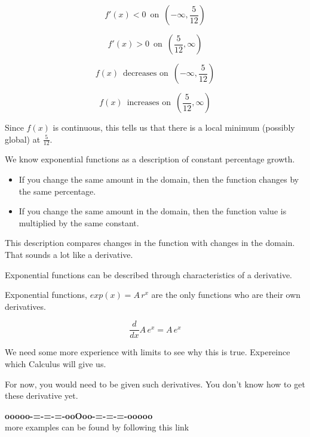 \documentclass{ximera}
\begin{document}
\begin{example}
\[
f'(x) < 0 \, \text{ on } \, \left( -\infty, \frac{5}{12} \right)
\]


\[
f'(x) > 0 \, \text{ on } \, \left( \frac{5}{12}, \infty \right)
\]





\[
f(x)  \, \text{ decreases on } \, \left( -\infty, \frac{5}{12} \right)
\]


\[
f(x)  \, \text{ increases on } \, \left( \frac{5}{12}, \infty \right)
\]



Since $f(x)$ is continuous, this tells us that there is a local minimum (possibly global) at $\frac{5}{12}$.


\end{example}






\begin{idea}


We know exponential functions as a description of constant percentage growth. 

\begin{itemize}
	\item If you change the same amount in the domain, then the function changes by the same percentage.
	\item If you change the same amount in the domain, then the function value is multiplied by the same constant.
\end{itemize}



This description compares changes in the function with changes in the domain. That sounds a lot like a derivative. 

Exponential functions can be described through characteristics of a derivative.


\begin{center}

Exponential functions, $exp(x) = A \, r^x$ are the only functions who are their own derivatives. 

\[
\frac{d}{dx} A \, e^x = A \, e^x
\]


\end{center}


\end{idea}


We need some more experience with limits to see why this is true. Expereince which Calculus will give us. 


For now, you would need to be given such derivatives.  You don't know how to get these derivative yet.




\begin{center}
\textbf{\textcolor{green!50!black}{ooooo-=-=-=-ooOoo-=-=-=-ooooo}} \\

more examples can be found by following this link\\ 

\end{center}
\end{document}
